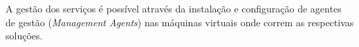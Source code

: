     
A gestão dos serviços é possível através da instalação e configuração de agentes de gestão (\emph{Management Agents}) nas máquinas virtuais onde correm as respectivas soluções.



\pagebreak

\pagebreak


